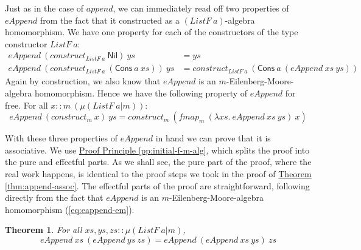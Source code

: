 \documentclass{jfp1}
\newtheorem{theorem}{Theorem}
\newcommand{\proofprinref}[1]{\hyperref[#1]{Proof Principle \ref*{#1}}}
\newcommand{\thmref}[1]{\hyperref[#1]{Theorem \ref*{#1}}}
\begin{document}
Just as in the case of $\mathit{append}$, we can immediately read off
two properties of $\mathit{eAppend}$ from the fact that it constructed
as a $(\mathit{ListF}~a)$-algebra homomorphism. We have one property
for each of the constructors of the type constructor
$\mathit{ListF}~a$:
\begin{align}
  \label{eq:eAppend-nil}
  \mathit{eAppend}~(\mathit{construct}_{\mathit{ListF}~a}~\mathsf{Nil})~\mathit{ys} & = \mathit{ys} \\
  \label{eq:eAppend-cons}
  \mathit{eAppend}~(\mathit{construct}_{\mathit{ListF}~a}~(\mathsf{Cons}~a~\mathit{xs}))~\mathit{ys} & = \mathit{construct}_{\mathit{ListF}~a}~(\mathsf{Cons}~a~(\mathit{eAppend}~\mathit{xs}~\mathit{ys}))
\end{align}
Again by construction, we also know that $\mathit{eAppend}$ is an
$m$-Eilenberg-Moore-algebra homomorphism. Hence we have the following
property of $\mathit{eAppend}$ for free. For all $x ::
m~(\mu(\mathit{ListF}~a|m))$:
\begin{equation}\label{eq:eappend-em}
  \mathit{eAppend}~(\mathit{construct}_m~\mathit{x})~\mathit{ys} = \mathit{construct}_m~(\mathit{fmap}_m~(\lambda \mathit{xs}.~\mathit{eAppend}~\mathit{xs}~\mathit{ys})~\mathit{x})
\end{equation}

With these three properties of $\mathit{eAppend}$ in hand we can prove
that it is associative. We use \proofprinref{pp:initial-f-m-alg},
which splits the proof into the pure and effectful parts. As we shall
see, the pure part of the proof, where the real work happens, is
identical to the proof steps we took in the proof of
\thmref{thm:append-assoc}. The effectful parts of the proof are
straightforward, following directly from the fact that
$\mathit{eAppend}$ is an $m$-Eilenberg-Moore-algebra homomorphism
(\autoref{eq:eappend-em}).

\begin{theorem}
  For all $\mathit{xs}, \mathit{ys}, \mathit{zs} :: \mu(\mathit{ListF}~a|m)$,
  \begin{displaymath}
    \mathit{eAppend}~\mathit{xs}~(\mathit{eAppend}~\mathit{ys}~\mathit{zs}) = \mathit{eAppend}~(\mathit{eAppend}~\mathit{xs}~\mathit{ys})~\mathit{zs}
  \end{displaymath}
\end{theorem}
\end{document}
